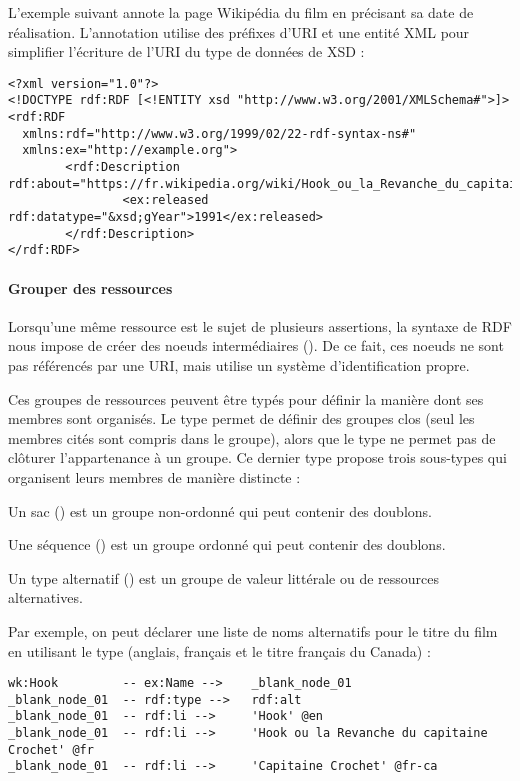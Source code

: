 L'exemple suivant annote la page Wikipédia du film  en précisant sa date de réalisation. L'annotation utilise des préfixes d'URI et une entité XML pour simplifier l'écriture de l'URI du type de données  de XSD : 
\begin{Verbatim}[fontsize=\small,formatcom=\color{black!70}]
<?xml version="1.0"?>
<!DOCTYPE rdf:RDF [<!ENTITY xsd "http://www.w3.org/2001/XMLSchema#">]>
<rdf:RDF
  xmlns:rdf="http://www.w3.org/1999/02/22-rdf-syntax-ns#"
  xmlns:ex="http://example.org">
        <rdf:Description rdf:about="https://fr.wikipedia.org/wiki/Hook_ou_la_Revanche_du_capitaine_Crochet">
                <ex:released rdf:datatype="&xsd;gYear">1991</ex:released>
        </rdf:Description>
</rdf:RDF>
\end{Verbatim}

\paragraph{Grouper des ressources}
Lorsqu'une même ressource est le sujet de plusieurs assertions, la syntaxe de RDF nous impose de créer des noeuds intermédiaires ().
De ce fait, ces noeuds ne sont pas référencés par une URI, mais utilise un système d'identification propre.

Ces groupes de ressources peuvent être typés pour définir la manière dont ses membres sont organisés.
Le type  permet de définir des groupes clos (seul les membres cités sont compris dans le groupe), alors que le type  ne permet pas de clôturer l'appartenance à un groupe.
Ce dernier type propose trois sous-types qui organisent leurs membres de manière distincte : 

\begin{liste}
  \item Un sac () est un groupe non-ordonné qui peut contenir des doublons.
  \item Une séquence () est un groupe ordonné qui peut contenir des doublons. 
  \item Un type alternatif () est un groupe de valeur littérale ou de ressources alternatives.
\end{liste}

Par exemple, on peut déclarer une liste de noms alternatifs pour le titre du film  en utilisant le type  (anglais, français et le titre français du Canada) :
\begin{Verbatim}[fontsize=\small,formatcom=\color{black!70}]
wk:Hook         -- ex:Name -->    _blank_node_01
_blank_node_01  -- rdf:type -->   rdf:alt
_blank_node_01  -- rdf:li -->     'Hook' @en 
_blank_node_01  -- rdf:li -->     'Hook ou la Revanche du capitaine Crochet' @fr
_blank_node_01  -- rdf:li -->     'Capitaine Crochet' @fr-ca
\end{Verbatim}


